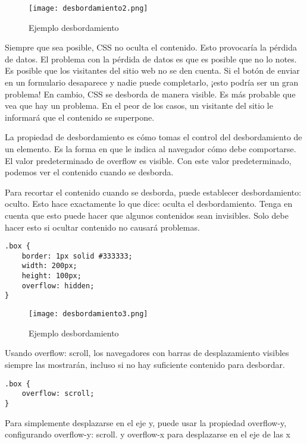 \begin{enumerate}
\begin{figure}[H]
	\center
	\texttt{[image: desbordamiento2.png]}
	\caption{Ejemplo desbordamiento}
	\label{fig:super}
\end{figure}

Siempre que sea posible, CSS no oculta el contenido. Esto provocaría la pérdida de datos. El problema con la pérdida de datos es que es posible que no lo notes. Es posible que los visitantes del sitio web no se den cuenta. Si el botón de enviar en un formulario desaparece y nadie puede completarlo, ¡esto podría ser un gran problema! En cambio, CSS se desborda de manera visible. Es más probable que vea que hay un problema. En el peor de los casos, un visitante del sitio le informará que el contenido se superpone.

La propiedad de desbordamiento es cómo tomas el control del desbordamiento de un elemento. Es la forma en que le indica al navegador cómo debe comportarse. El valor predeterminado de overflow es visible. Con este valor predeterminado, podemos ver el contenido cuando se desborda.

Para recortar el contenido cuando se desborda, puede establecer desbordamiento: oculto. Esto hace exactamente lo que dice: oculta el desbordamiento. Tenga en cuenta que esto puede hacer que algunos contenidos sean invisibles. Solo debe hacer esto si ocultar contenido no causará problemas.

\begin{lstlisting}
.box {
	border: 1px solid #333333;
	width: 200px;
	height: 100px;
	overflow: hidden;
}
\end{lstlisting}

\begin{figure}[H]
	\center
	\texttt{[image: desbordamiento3.png]}
	\caption{Ejemplo desbordamiento}
	\label{fig:super}
\end{figure}

Usando overflow: scroll, los navegadores con barras de desplazamiento visibles siempre las mostrarán, incluso si no hay suficiente contenido para desbordar.

\begin{lstlisting}
.box {
	overflow: scroll;
}
\end{lstlisting}

\begin{remark}
Para simplemente desplazarse en el eje y, puede usar la propiedad overflow-y, configurando overflow-y: scroll. y overflow-x para desplazarse en el eje de las x
\end{remark}


\end{enumerate}
